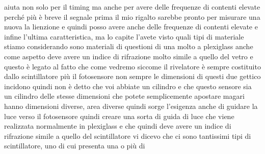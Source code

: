 aiuta non solo per il timing ma anche per avere delle frequenze di contenti elevate perché più è breve il segnale prima il mio rigalto sarebbe pronto per misurare una nuova la lienzione e quindi posso avere anche delle frequenze di contenti elevate e infine l'ultima caratteristica, ma lo capite l'avete visto quali tipi di materiale stiamo considerando sono materiali di questioni di una molto a plexiglass anche come aspetto deve avere un indice di rifrazione molto simile a quello del vetro e questo è legato al fatto che come vedremo siccome il rivelatore è sempre costituito dallo scintillatore più il fotosensore non sempre le dimensioni di questi due gettico incidono quindi non è detto che voi abbiate un cilindro e che questo sensore sia un cilindro delle stesse dimensioni che potete semplicemente apostare magari hanno dimensioni diverse, area diverse quindi sorge l'esigenza anche di guidare la luce verso il fotosensore quindi creare una sorta di guida di luce che viene realizzata normalmente in plexiglass e che quindi deve avere un indice di rifrazione simile a quello del scintillatore vi dicevo che ci sono tantissimi tipi di scintillatore, uno di cui presenta una o più di 

